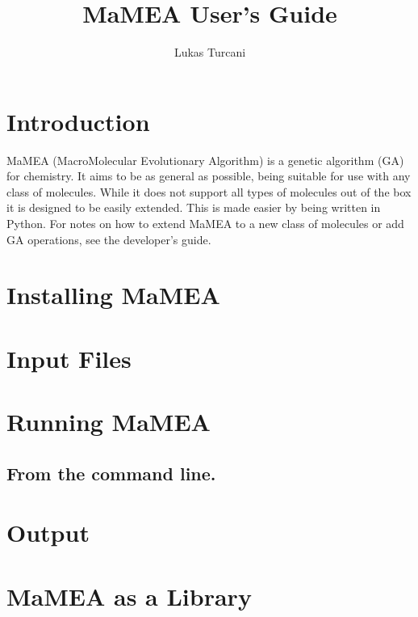 \documentclass{article}
\title{MaMEA User's Guide}
\author{Lukas Turcani}
\begin{document}
\begin{titlepage}
	\maketitle
\end{titlepage}

\tableofcontents
\newpage
\section{Introduction}
MaMEA (MacroMolecular Evolutionary Algorithm) is a genetic algorithm (GA) for chemistry. It aims to be as general as possible, being suitable for use with any class of molecules. While it does not support all types of molecules out of the box it is designed to be easily extended. This is made easier by being written in Python. For notes on how to extend MaMEA to a new class of molecules or add GA operations, see the developer's guide.

\section{Installing MaMEA}

\section{Input Files}

\section{Running MaMEA}

\subsection{From the command line.}


\section{Output}

\section{MaMEA as a Library}
\end{document}
